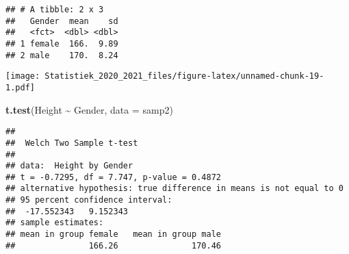\documentclass[
  12pt,dutch,coursenotes]{book}
\newenvironment{Shaded}{\begin{snugshade}}{\end{snugshade}}
\newcommand{\DataTypeTok}[1]{\textcolor[rgb]{0.13,0.29,0.53}{#1}}
\newcommand{\DecValTok}[1]{\textcolor[rgb]{0.00,0.00,0.81}{#1}}
\newcommand{\KeywordTok}[1]{\textcolor[rgb]{0.13,0.29,0.53}{\textbf{#1}}}
\newcommand{\NormalTok}[1]{#1}
\newcommand{\OperatorTok}[1]{\textcolor[rgb]{0.81,0.36,0.00}{\textbf{#1}}}
\newcommand{\OtherTok}[1]{\textcolor[rgb]{0.56,0.35,0.01}{#1}}
\newcommand{\StringTok}[1]{\textcolor[rgb]{0.31,0.60,0.02}{#1}}
\theoremstyle{definition}
\theoremstyle{definition}
\theoremstyle{definition}
\theoremstyle{remark}
\begin{document}
\begin{verbatim}
## # A tibble: 2 x 3
##   Gender  mean    sd
##   <fct>  <dbl> <dbl>
## 1 female  166.  9.89
## 2 male    170.  8.24
\end{verbatim}

\begin{Shaded}
\end{Shaded}

\texttt{[image: Statistiek\_2020\_2021\_files/figure-latex/unnamed-chunk-19-1.pdf]}

\begin{Shaded}
\begin{Highlighting}[]
\KeywordTok{t.test}\NormalTok{(Height }\OperatorTok{\textasciitilde{}}\StringTok{ }\NormalTok{Gender, }\DataTypeTok{data =}\NormalTok{ samp2)}
\end{Highlighting}
\end{Shaded}

\begin{verbatim}
## 
##  Welch Two Sample t-test
## 
## data:  Height by Gender
## t = -0.7295, df = 7.747, p-value = 0.4872
## alternative hypothesis: true difference in means is not equal to 0
## 95 percent confidence interval:
##  -17.552343   9.152343
## sample estimates:
## mean in group female   mean in group male 
##               166.26               170.46
\end{verbatim}
\end{document}

